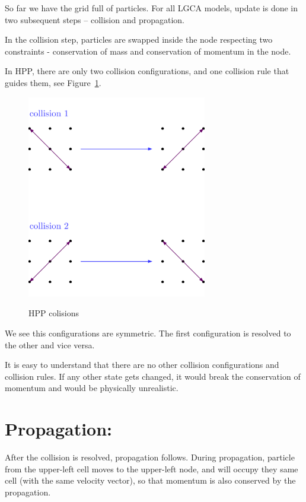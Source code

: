 So far we have the grid full of particles.
For all LGCA models, update is done in two subsequent steps -- collision and propagation.

In the collision step, particles are swapped inside the node respecting two constraints - conservation of mass and conservation of momentum in the node.

In HPP, there are only two collision configurations, and one collision rule that guides them, see Figure~\ref{hpp-colision}.

\begin{figure}[H]
 \centering
 \includegraphics[width=0.7\textwidth]{./img/hpp_col}
 \label{hpp-colision}
 \caption{HPP colisions}
\end{figure}

We see this configurations are symmetric. The first configuration is resolved to the other and vice versa.

It is easy to understand that there are no other collision configurations and collision rules. If any other state gets changed, it would break the conservation of momentum and would be physically unrealistic.

\section{Propagation:}

After the collision is resolved, propagation follows.
During propagation, particle from the upper-left cell moves to the upper-left node, and will occupy they same cell (with the same velocity vector), so that momentum is also conserved by the propagation.

